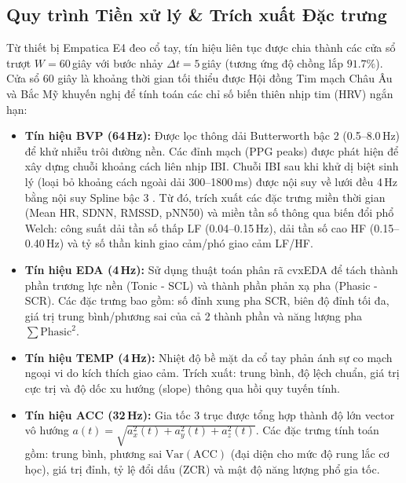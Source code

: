 \documentclass[conference]{IEEEtran}
\begin{document}
\subsection{Quy trình Tiền xử lý \& Trích xuất Đặc trưng}
Từ thiết bị Empatica E4 đeo cổ tay, tín hiệu liên tục được chia thành các cửa sổ trượt $W = 60$\,giây với bước nhảy $\Delta t = 5$\,giây (tương ứng độ chồng lắp $91.7\%$). Cửa sổ 60 giây là khoảng thời gian tối thiểu được Hội đồng Tim mạch Châu Âu và Bắc Mỹ \cite{taskforce1996heart} khuyến nghị để tính toán các chỉ số biến thiên nhịp tim (HRV) ngắn hạn:
\begin{itemize}
    \item \textbf{Tín hiệu BVP (64\,Hz):} Được lọc thông dải Butterworth bậc 2 (0.5--8.0\,Hz) để khử nhiễu trôi đường nền. Các đỉnh mạch (PPG peaks) được phát hiện để xây dựng chuỗi khoảng cách liên nhịp IBI. Chuỗi IBI sau khi khử dị biệt sinh lý (loại bỏ khoảng cách ngoài dải 300--1800\,ms) được nội suy về lưới đều 4\,Hz bằng nội suy Spline bậc 3 \cite{tarvainen2014kubios}. Từ đó, trích xuất các đặc trưng miền thời gian (Mean HR, SDNN, RMSSD, pNN50) và miền tần số thông qua biến đổi phổ Welch: công suất dải tần số thấp LF (0.04--0.15\,Hz), dải tần số cao HF (0.15--0.40\,Hz) và tỷ số thần kinh giao cảm/phó giao cảm LF/HF.
    \item \textbf{Tín hiệu EDA (4\,Hz):} Sử dụng thuật toán phân rã cvxEDA \cite{greco2016cvxeda} để tách thành phần trương lực nền (Tonic - SCL) và thành phần phản xạ pha (Phasic - SCR). Các đặc trưng bao gồm: số đỉnh xung pha SCR, biên độ đỉnh tối đa, giá trị trung bình/phương sai của cả 2 thành phần và năng lượng pha $\sum \text{Phasic}^2$.
    \item \textbf{Tín hiệu TEMP (4\,Hz):} Nhiệt độ bề mặt da cổ tay phản ánh sự co mạch ngoại vi do kích thích giao cảm. Trích xuất: trung bình, độ lệch chuẩn, giá trị cực trị và độ dốc xu hướng (slope) thông qua hồi quy tuyến tính.
    \item \textbf{Tín hiệu ACC (32\,Hz):} Gia tốc 3 trục được tổng hợp thành độ lớn vector vô hướng $a(t) = \sqrt{a_x^2(t) + a_y^2(t) + a_z^2(t)}$. Các đặc trưng tính toán gồm: trung bình, phương sai $\text{Var}(\text{ACC})$ (đại diện cho mức độ rung lắc cơ học), giá trị đỉnh, tỷ lệ đổi dấu (ZCR) và mật độ năng lượng phổ gia tốc.
\end{itemize}
\end{document}
